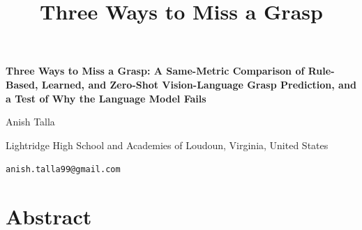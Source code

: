 \documentclass[12pt,letterpaper]{article}
\title{Three Ways to Miss a Grasp}
\begin{document}

\begin{center}
{\Large\bfseries Three Ways to Miss a Grasp: A Same-Metric Comparison of
Rule-Based, Learned, and Zero-Shot Vision-Language Grasp Prediction, and a
Test of Why the Language Model Fails\par}
\vspace{0.2in}
{\large Anish Talla\par}
{Lightridge High School and Academies of Loudoun, Virginia, United States\par}
{\texttt{anish.talla99@gmail.com}\par}
\end{center}
\vspace{0.2in}
\section*{Abstract}
\end{document}
